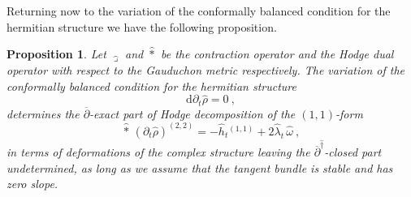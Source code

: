 \documentclass[12pt,a4paper]{article}
\def\bar#1{\overline{#1}}
\let\p=\partial
\def\d{\textrm{d}}
\def\bp{\bar{\partial}}
\newtheorem{Proposition}{Proposition}
\theoremstyle{definition}
\begin{document}
Returning now to the variation of the conformally balanced condition for the hermitian structure we have the following proposition.

\begin{Proposition}\label{prop:CBcond}
Let $\widehat\lrcorner$ and $\hat *$ be the contraction operator and the Hodge dual operator with respect to 
the Gauduchon metric respectively.
The variation of the conformally balanced condition for the hermitian structure
\begin{equation}
\d \p_t\hat\rho = 0~,\label{eq:dvarhatrho}
\end{equation}
determines the $\bp$-exact part of Hodge decomposition of the $(1,1)$-form 
\[\hat*\, (\p_t\hat\rho)^{(2,2)} = - \hat h_t{}^{(1,1)} + 2\hat\lambda_t\, \widehat\omega~,\] 
in terms of deformations of the complex structure leaving the $\bp^{\hat\dagger}$-closed part undetermined, as long as we assume that 
the tangent bundle is stable and has zero slope.   
\end{Proposition}
\end{document}
